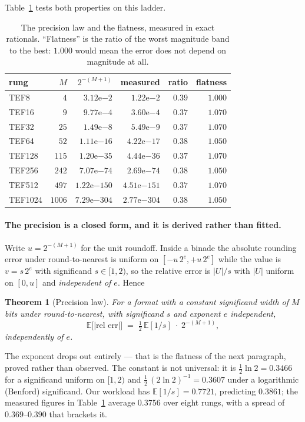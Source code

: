 \documentclass[11pt]{article}
\newtheorem{theorem}{Theorem}
\theoremstyle{definition}
\begin{document}
Table~\ref{tab:law} tests both properties on this ladder.

\begin{table}[t]\centering
\caption{The precision law and the flatness, measured in exact rationals.
``Flatness'' is the ratio of the worst magnitude band to the best: $1.000$ would
mean the error does not depend on magnitude at all.}
\label{tab:law}
\begin{tabular}{lrrrrr}
\toprule
rung & $M$ & $2^{-(M+1)}$ & measured & ratio & flatness \\
\midrule
TEF8    & $4$    & $3.12\mathrm{e}{-2}$   & $1.22\mathrm{e}{-2}$   & $0.39$ & $1.000$ \\
TEF16   & $9$    & $9.77\mathrm{e}{-4}$   & $3.60\mathrm{e}{-4}$   & $0.37$ & $1.070$ \\
TEF32   & $25$   & $1.49\mathrm{e}{-8}$   & $5.49\mathrm{e}{-9}$   & $0.37$ & $1.070$ \\
TEF64   & $52$   & $1.11\mathrm{e}{-16}$  & $4.22\mathrm{e}{-17}$  & $0.38$ & $1.050$ \\
TEF128  & $115$  & $1.20\mathrm{e}{-35}$  & $4.44\mathrm{e}{-36}$  & $0.37$ & $1.070$ \\
TEF256  & $242$  & $7.07\mathrm{e}{-74}$  & $2.69\mathrm{e}{-74}$  & $0.38$ & $1.050$ \\
TEF512  & $497$  & $1.22\mathrm{e}{-150}$ & $4.51\mathrm{e}{-151}$ & $0.37$ & $1.070$ \\
TEF1024 & $1006$ & $7.29\mathrm{e}{-304}$ & $2.77\mathrm{e}{-304}$ & $0.38$ & $1.050$ \\
\bottomrule
\end{tabular}
\end{table}

\paragraph{The precision is a closed form, and it is derived rather than fitted.}
Write $u = 2^{-(M+1)}$ for the unit roundoff. Inside a binade the absolute
rounding error under round-to-nearest is uniform on $[-u\,2^{e}, +u\,2^{e}]$
while the value is $v = s\,2^{e}$ with significand $s \in [1,2)$, so the relative
error is $|U|/s$ with $|U|$ uniform on $[0,u]$ and \emph{independent of $e$}.
Hence
\begin{theorem}[Precision law]\label{thm:law}
For a format with a constant significand width of $M$ bits under
round-to-nearest, with significand $s$ and exponent $e$ independent,
\[
  \mathbb{E}\bigl[|\text{rel err}|\bigr] \;=\; \tfrac{1}{2}\,\mathbb{E}[1/s]\;\cdot\;2^{-(M+1)} ,
\]
independently of $e$.
\end{theorem}
The exponent drops out entirely --- that is the flatness of the next paragraph,
proved rather than observed. The constant is not universal: it is
$\tfrac{1}{2}\ln 2 = 0.3466$ for a significand uniform on $[1,2)$ and
$\tfrac{1}{2}\,(2\ln 2)^{-1} = 0.3607$ under a logarithmic (Benford) significand.
Our workload has $\mathbb{E}[1/s] = 0.7721$, predicting $0.3861$; the measured
figures in Table~\ref{tab:law} average $0.3756$ over eight rungs, with a spread
of $0.369$--$0.390$ that brackets it.
\end{document}
